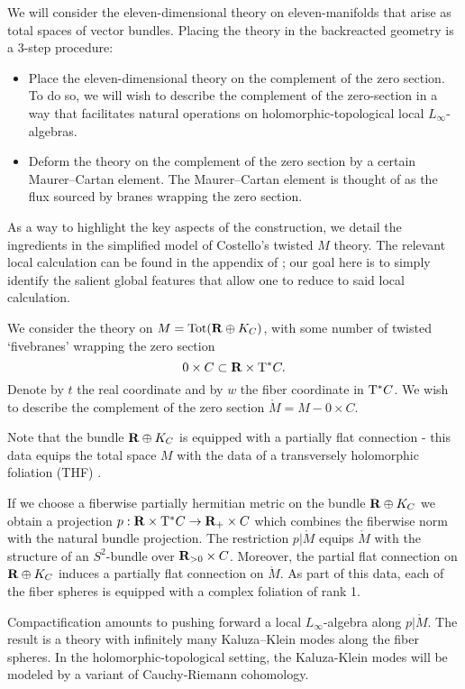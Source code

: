 We will consider the eleven-dimensional theory on eleven-manifolds that arise as total spaces of vector bundles. Placing the theory in the backreacted geometry is a 3-step procedure:

\begin{itemize}
  \item Place the eleven-dimensional theory on the complement of the zero section. To do so, we will wish to describe the complement of the zero-section in a way that facilitates natural operations on holomorphic-topological local $L_{\infty}$-algebras.

  \item Deform the theory on the complement of the zero section by a certain Maurer--Cartan element.
  The Maurer--Cartan element is thought of as the flux sourced by branes wrapping the zero section.
\end{itemize}

\parsec[s:brkevin]
As a way to highlight the key aspects of the construction, we detail the ingredients in the simplified model of Costello's twisted $M$ theory. The relevant local calculation can be found in the appendix of \cite{}; our goal here is to simply identify the salient global features that allow one to reduce to said local calculation.

We consider the theory on $M = \text{Tot} (\mathbf{R}\oplus K_{C})$, with some number of twisted `fivebranes' wrapping the zero section
\[
0 \times C \subset \mathbf{R} \times {\rm T}^* C .
\]
Denote by $t$ the real coordinate and by $w$ the fiber coordinate in ${\rm T}^* C$. We wish to describe the complement of the zero section $\mathring M = M - 0 \times C$.

Note that the bundle $\mathbf{R}\oplus K_{C}$ is equipped with a partially flat connection - this data equips the total space $M$ with the data of a transversely holomorphic foliation (THF) \cite{DuchampKalka}.

If we choose a fiberwise partially hermitian metric on the bundle $\mathbf{R} \oplus K_C$ we obtain a projection $p: \mathbf{R} \times {\rm T}^*C \to \mathbf{R}_{+} \times C$ which combines the fiberwise norm with the natural bundle projection. The restriction $p| \mathring M$ equips $\mathring M$ with the structure of an $S^{2}$-bundle over $\mathbf{R}_{>0}\times C$. Moreover, the partial flat connection on $\mathbf{R}\oplus K_{C}$ induces a partially flat connection on $\mathring M$. As part of this data, each of the fiber spheres is equipped with a complex foliation of rank 1.

Compactification amounts to pushing forward a local $L_{\infty}$-algebra along $p| \mathring M$. The result is a theory with infinitely many Kaluza--Klein modes along the fiber spheres. In the holomorphic-topological setting, the Kaluza-Klein modes will be modeled by a variant of Cauchy-Riemann cohomology.

